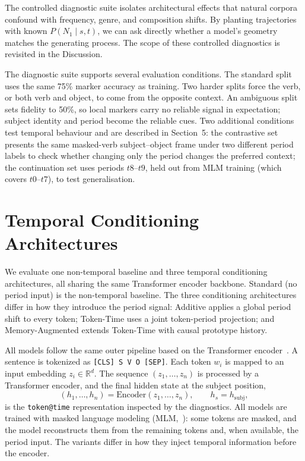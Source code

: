 \documentclass[runningheads]{llncs}
\begin{document}
The controlled diagnostic suite isolates architectural effects that natural
corpora confound with frequency, genre, and composition shifts. By planting
trajectories with known \(P(N_1 \mid s, t)\), we can ask directly whether a
model's geometry matches the generating process. The scope of these controlled
diagnostics is revisited in the Discussion.

The diagnostic suite supports several evaluation conditions. The standard split uses
the same 75\% marker accuracy as training. Two harder splits force the verb, or
both verb and object, to come from the opposite context. An ambiguous split sets
fidelity to 50\%, so local markers carry no reliable signal in expectation; subject
identity and period become the reliable cues. Two additional conditions test temporal behaviour
and are described in Section~5: the contrastive set presents the same
masked-verb subject--object frame under two different period labels to check whether changing only the
period changes the preferred context; the continuation set uses periods \(t8\)--\(t9\), held out from MLM training
(which covers \(t0\)--\(t7\)), to test generalisation.

\section{Temporal Conditioning Architectures}
We evaluate one non-temporal baseline and three temporal conditioning architectures,
all sharing the same Transformer encoder backbone. Standard (no period input) is
the non-temporal baseline. The three conditioning architectures differ in how
they introduce the period signal: Additive applies a global period shift to every
token; Token-Time uses a joint token-period projection; and Memory-Augmented
extends Token-Time with causal prototype history.

All models follow the same outer pipeline based on the Transformer
encoder~\cite{vaswani2017attention}. A sentence is tokenized as
\texttt{[CLS] S V O [SEP]}. Each token \(w_i\) is mapped to an input embedding
\(z_i \in \mathbb{R}^d\). The sequence \((z_1,\ldots,z_n)\) is processed by a
Transformer encoder, and the final hidden state at the subject position,
\[
  (h_1,\ldots,h_n) = \mathrm{Encoder}(z_1,\ldots,z_n),
  \qquad h_s = h_{\mathrm{subj}},
\]
is the \texttt{token@time} representation inspected by the diagnostics. All
models are trained with masked language modeling
(MLM,~\cite{devlin2019bert}): some tokens are masked, and the model reconstructs
them from the remaining tokens and, when available, the period input. The
variants differ in how they inject temporal information before the encoder.
\end{document}
